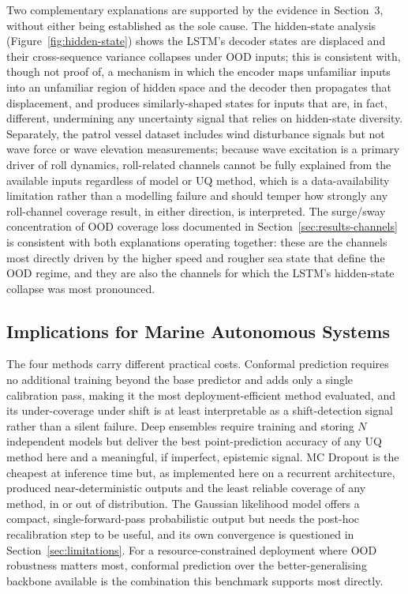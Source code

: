 \documentclass[a4paper,fleqn]{cas-sc}
\begin{document}
Two complementary explanations are supported by the evidence in Section~3, without either being established as the sole cause. The hidden-state analysis (Figure~\ref{fig:hidden-state}) shows the LSTM's decoder states are displaced and their cross-sequence variance collapses under OOD inputs; this is consistent with, though not proof of, a mechanism in which the encoder maps unfamiliar inputs into an unfamiliar region of hidden space and the decoder then propagates that displacement, and produces similarly-shaped states for inputs that are, in fact, different, undermining any uncertainty signal that relies on hidden-state diversity. Separately, the patrol vessel dataset includes wind disturbance signals but not wave force or wave elevation measurements; because wave excitation is a primary driver of roll dynamics, roll-related channels cannot be fully explained from the available inputs regardless of model or UQ method, which is a data-availability limitation rather than a modelling failure and should temper how strongly any roll-channel coverage result, in either direction, is interpreted. The surge/sway concentration of OOD coverage loss documented in Section~\ref{sec:results-channels} is consistent with both explanations operating together: these are the channels most directly driven by the higher speed and rougher sea state that define the OOD regime, and they are also the channels for which the LSTM's hidden-state collapse was most pronounced.

\subsection{Implications for Marine Autonomous Systems}

The four methods carry different practical costs. Conformal prediction requires no additional training beyond the base predictor and adds only a single calibration pass, making it the most deployment-efficient method evaluated, and its under-coverage under shift is at least interpretable as a shift-detection signal rather than a silent failure. Deep ensembles require training and storing $N$ independent models but deliver the best point-prediction accuracy of any UQ method here and a meaningful, if imperfect, epistemic signal. MC Dropout is the cheapest at inference time but, as implemented here on a recurrent architecture, produced near-deterministic outputs and the least reliable coverage of any method, in or out of distribution. The Gaussian likelihood model offers a compact, single-forward-pass probabilistic output but needs the post-hoc recalibration step to be useful, and its own convergence is questioned in Section~\ref{sec:limitations}. For a resource-constrained deployment where OOD robustness matters most, conformal prediction over the better-generalising backbone available is the combination this benchmark supports most directly.
\end{document}
